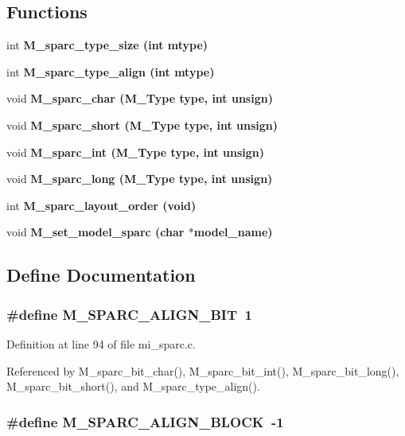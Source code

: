 \subsection*{Functions}
\begin{CompactItemize}
\item 
int \bf{M\_\-sparc\_\-type\_\-size} (int mtype)
\item 
int \bf{M\_\-sparc\_\-type\_\-align} (int mtype)
\item 
void \bf{M\_\-sparc\_\-char} (\bf{M\_\-Type} type, int unsign)
\item 
void \bf{M\_\-sparc\_\-short} (\bf{M\_\-Type} type, int unsign)
\item 
void \bf{M\_\-sparc\_\-int} (\bf{M\_\-Type} type, int unsign)
\item 
void \bf{M\_\-sparc\_\-long} (\bf{M\_\-Type} type, int unsign)
\item 
int \bf{M\_\-sparc\_\-layout\_\-order} (void)
\item 
void \bf{M\_\-set\_\-model\_\-sparc} (char $\ast$model\_\-name)
\end{CompactItemize}


\subsection{Define Documentation}
\subsubsection{\setlength{\rightskip}{0pt plus 5cm}\#define M\_\-SPARC\_\-ALIGN\_\-BIT~1}\label{mi__sparc_8c_6f37e98dbe60e0087bfee462eb537764}




Definition at line 94 of file mi\_\-sparc.c.

Referenced by M\_\-sparc\_\-bit\_\-char(), M\_\-sparc\_\-bit\_\-int(), M\_\-sparc\_\-bit\_\-long(), M\_\-sparc\_\-bit\_\-short(), and M\_\-sparc\_\-type\_\-align().
\subsubsection{\setlength{\rightskip}{0pt plus 5cm}\#define M\_\-SPARC\_\-ALIGN\_\-BLOCK~-1}\label{mi__sparc_8c_5c4d512d8d3a8d38520be33d88853441}




